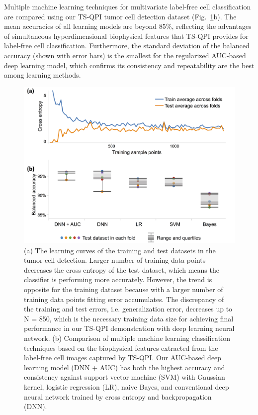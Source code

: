 \documentclass[aps,pra,reprint,longbibliography,superscriptaddress]{revtex4-1}
\begin{document}
Multiple machine learning techniques for multivariate label-free cell classification are compared using our TS-QPI tumor cell detection dataset (Fig.~\ref{fig:LearningCurve}b). The mean accuracies of all learning models are beyond 85\%, reflecting the advantages of simultaneous hyperdimensional biophysical features that TS-QPI provides for label-free cell classification. Furthermore, the standard deviation of the balanced accuracy (shown with error bars) is the smallest for the regularized AUC-based deep learning model, which confirms its consistency and repeatability are the best among learning methods.

\begin{figure}
\includegraphics[scale=0.08]{FigureLearningCurve.jpg}
\caption{\label{fig:LearningCurve} (a) The learning curves of the training and test datasets in the tumor cell detection. Larger number of training data points decreases the cross entropy of the test dataset, which means the classifier is performing more accurately. However, the trend is opposite for the training dataset because with a larger number of training data points fitting error accumulates. The discrepancy of the training and test errors, i.e. generalization error, decreases up to N = 850, which is the necessary training data size for achieving final performance in our TS-QPI demonstration with deep learning neural network. (b) Comparison of multiple machine learning classification techniques based on the biophysical features extracted from the label-free cell images captured by TS-QPI. Our AUC-based deep learning model (DNN + AUC) has both the highest accuracy and consistency against support vector machine (SVM) with Gaussian kernel, logistic regression (LR), naive Bayes, and conventional deep neural network trained by cross entropy and backpropagation (DNN).}
\end{figure}
\end{document}
